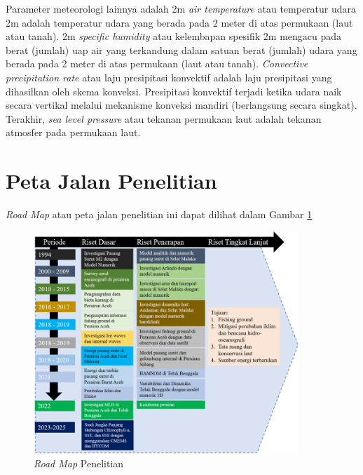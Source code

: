 \begin{spacing}{1.5}
	Parameter meteorologi lainnya adalah 2m \textit{air temperature} atau temperatur udara 2m adalah temperatur udara yang berada pada 2 meter di atas permukaan (laut atau tanah). 2m \textit{specific humidity} atau kelembapan spesifik 2m mengacu pada berat (jumlah) uap air yang terkandung dalam satuan berat (jumlah) udara yang berada pada 2 meter di atas permukaan (laut atau tanah). \textit{Convective precipitation rate} atau laju presipitasi konvektif adalah laju presipitasi yang dihasilkan oleh skema konveksi. Presipitasi konvektif terjadi ketika udara naik secara vertikal melalui mekanisme konveksi mandiri (berlangsung secara singkat). Terakhir, \textit{sea level pressure} atau tekanan permukaan laut adalah tekanan atmosfer pada permukaan laut.
	
	
\end{spacing}
\vspace{-1pc}
\section[Peta Jalan Penelitian]{Peta Jalan Penelitian}
\begin{spacing}{1.5}
	\textit{Road Map} atau peta jalan penelitian ini dapat dilihat dalam Gambar \ref{fig:RM}
	\begin{figure}[H]
		\centering
		\includegraphics[width=10cm]{contents/Figures/Road_Map}
		\caption{\textit{Road Map} Penelitian}
		\label{fig:RM}
	\end{figure}
	
\end{spacing}